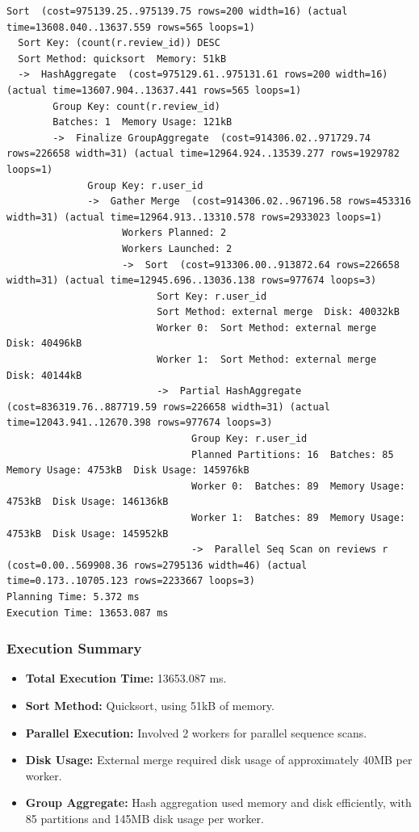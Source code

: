 \documentclass[12pt]{article}
\begin{document}
\begin{lstlisting}[caption={Execution Plan}]
Sort  (cost=975139.25..975139.75 rows=200 width=16) (actual time=13608.040..13637.559 rows=565 loops=1)
  Sort Key: (count(r.review_id)) DESC
  Sort Method: quicksort  Memory: 51kB
  ->  HashAggregate  (cost=975129.61..975131.61 rows=200 width=16) (actual time=13607.904..13637.441 rows=565 loops=1)
        Group Key: count(r.review_id)
        Batches: 1  Memory Usage: 121kB
        ->  Finalize GroupAggregate  (cost=914306.02..971729.74 rows=226658 width=31) (actual time=12964.924..13539.277 rows=1929782 loops=1)
              Group Key: r.user_id
              ->  Gather Merge  (cost=914306.02..967196.58 rows=453316 width=31) (actual time=12964.913..13310.578 rows=2933023 loops=1)
                    Workers Planned: 2
                    Workers Launched: 2
                    ->  Sort  (cost=913306.00..913872.64 rows=226658 width=31) (actual time=12945.696..13036.138 rows=977674 loops=3)
                          Sort Key: r.user_id
                          Sort Method: external merge  Disk: 40032kB
                          Worker 0:  Sort Method: external merge  Disk: 40496kB
                          Worker 1:  Sort Method: external merge  Disk: 40144kB
                          ->  Partial HashAggregate  (cost=836319.76..887719.59 rows=226658 width=31) (actual time=12043.941..12670.398 rows=977674 loops=3)
                                Group Key: r.user_id
                                Planned Partitions: 16  Batches: 85  Memory Usage: 4753kB  Disk Usage: 145976kB
                                Worker 0:  Batches: 89  Memory Usage: 4753kB  Disk Usage: 146136kB
                                Worker 1:  Batches: 89  Memory Usage: 4753kB  Disk Usage: 145952kB
                                ->  Parallel Seq Scan on reviews r  (cost=0.00..569908.36 rows=2795136 width=46) (actual time=0.173..10705.123 rows=2233667 loops=3)
Planning Time: 5.372 ms
Execution Time: 13653.087 ms
\end{lstlisting}

\subsubsection*{Execution Summary}
\begin{itemize}
    \item \textbf{Total Execution Time:} 13653.087 ms.
    \item \textbf{Sort Method:} Quicksort, using 51kB of memory.
    \item \textbf{Parallel Execution:} Involved 2 workers for parallel sequence scans.
    \item \textbf{Disk Usage:} External merge required disk usage of approximately 40MB per worker.
    \item \textbf{Group Aggregate:} Hash aggregation used memory and disk efficiently, with 85 partitions and 145MB disk usage per worker.
\end{itemize}
\end{document}
